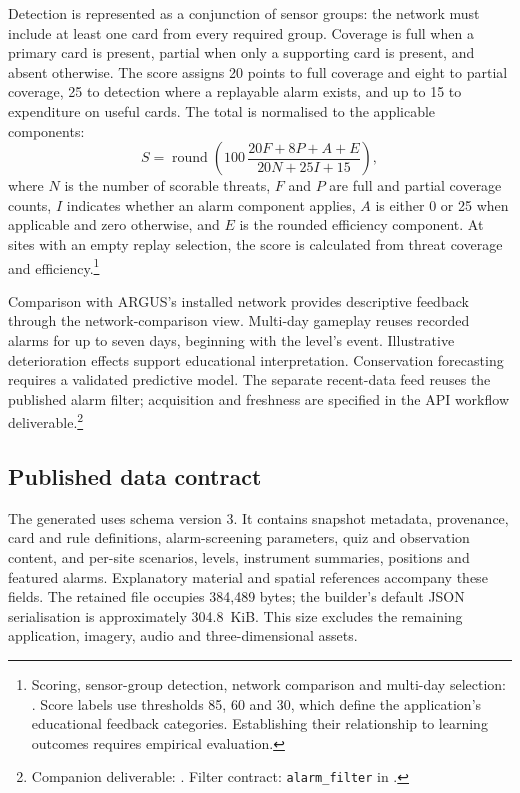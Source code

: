 \documentclass[10pt,a4paper]{article}
\begin{document}
Detection is represented as a conjunction of sensor groups: the network must include at least one card from every required group. Coverage is full when a primary card is present, partial when only a supporting card is present, and absent otherwise. The score assigns 20 points to full coverage and eight to partial coverage, 25 to detection where a replayable alarm exists, and up to 15 to expenditure on useful cards. The total is normalised to the applicable components:
\begin{equation}
S=\operatorname{round}\!\left(100\,\frac{20F+8P+A+E}{20N+25I+15}\right),
\end{equation}
where $N$ is the number of scorable threats, $F$ and $P$ are full and partial coverage counts, $I$ indicates whether an alarm component applies, $A$ is either 0 or 25 when applicable and zero otherwise, and $E$ is the rounded efficiency component. At sites with an empty replay selection, the score is calculated from threat coverage and efficiency.\footnote{Scoring, sensor-group detection, network comparison and multi-day selection: . Score labels use thresholds 85, 60 and 30, which define the application's educational feedback categories. Establishing their relationship to learning outcomes requires empirical evaluation.}

Comparison with ARGUS's installed network provides descriptive feedback through the network-comparison view. Multi-day gameplay reuses recorded alarms for up to seven days, beginning with the level's event. Illustrative deterioration effects support educational interpretation. Conservation forecasting requires a validated predictive model. The separate recent-data feed reuses the published alarm filter; acquisition and freshness are specified in the API workflow deliverable.\footnote{Companion deliverable: . Filter contract: \texttt{alarm\_filter} in .}

\subsection{Published data contract}
The generated  uses schema version 3. It contains snapshot metadata, provenance, card and rule definitions, alarm-screening parameters, quiz and observation content, and per-site scenarios, levels, instrument summaries, positions and featured alarms. Explanatory material and spatial references accompany these fields. The retained file occupies 384,489 bytes; the builder's default JSON serialisation is approximately 304.8~KiB. This size excludes the remaining application, imagery, audio and three-dimensional assets.
\end{document}
